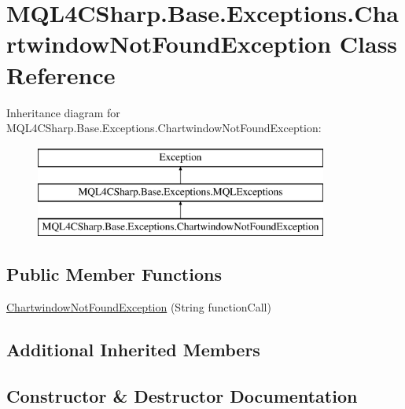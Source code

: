 \hypertarget{class_m_q_l4_c_sharp_1_1_base_1_1_exceptions_1_1_chartwindow_not_found_exception}{}\section{M\+Q\+L4\+C\+Sharp.\+Base.\+Exceptions.\+Chartwindow\+Not\+Found\+Exception Class Reference}
\label{class_m_q_l4_c_sharp_1_1_base_1_1_exceptions_1_1_chartwindow_not_found_exception}
Inheritance diagram for M\+Q\+L4\+C\+Sharp.\+Base.\+Exceptions.\+Chartwindow\+Not\+Found\+Exception\+:\begin{figure}[H]
\begin{center}
\leavevmode
\includegraphics[height=3.000000cm]{class_m_q_l4_c_sharp_1_1_base_1_1_exceptions_1_1_chartwindow_not_found_exception}
\end{center}
\end{figure}
\subsection*{Public Member Functions}
\begin{DoxyCompactItemize}
\item 
\hyperlink{class_m_q_l4_c_sharp_1_1_base_1_1_exceptions_1_1_chartwindow_not_found_exception_a672615e1396dc5c0676396e2ac3b008e}{Chartwindow\+Not\+Found\+Exception} (String function\+Call)
\end{DoxyCompactItemize}
\subsection*{Additional Inherited Members}


\subsection{Constructor \& Destructor Documentation}
